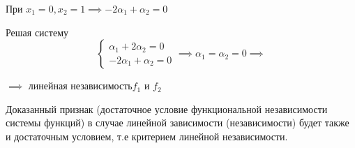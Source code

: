 \documentclass[../../main.tex]{subfiles}
\begin{document}
\begin{examples}
\begin{itemize}
		При $x_1 =0, x_2 = 1 \implies -2\alpha_1 + \alpha_2 = 0$
		
		Решая систему
		\[ \begin{cases}
		\alpha_1 + 2\alpha_2 = 0 \\
		-2\alpha_1 + \alpha_2 = 0
		\end{cases} \implies \alpha_1 = \alpha_2 = 0 \implies \]
		
		$\implies$ линейная независимость$f_1 \text{ и } f_2$
		
	\end{itemize}
	
\end{examples}

\begin{remark}
	\;
	
	Доказанный признак (достаточное условие функциональной 
	независимости системы функций) 
	в случае линейной зависимости (независимости) будет также и 
	достаточным условием, т.е критерием линейной независимости.
\end{remark}


	
	
	
\end{document}
